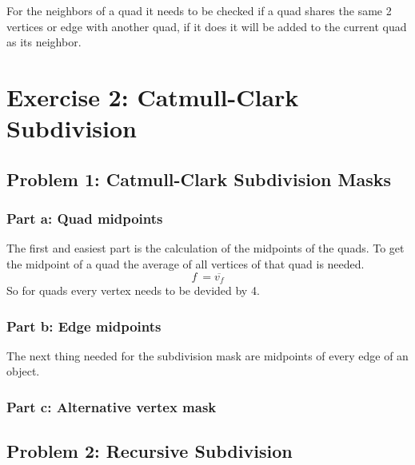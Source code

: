 \documentclass[11.5pt,oneside,a4paper]{scrartcl}
\newcounter{ct}
\begin{document}
\newpage
For the neighbors of a quad it needs to be checked if a quad shares the same 2 vertices or edge with another quad, if it does it will be added to the current quad as its neighbor.

\section{Exercise 2: Catmull-Clark Subdivision}

\subsection{Problem 1: Catmull-Clark Subdivision Masks}

\subsubsection{Part a: Quad midpoints}
The first and easiest part is the calculation of the midpoints of the quads. To get the midpoint of a quad the average of all vertices of that quad is needed.
\begin{equation} \label{quadratic}
        f \ = \overline{v_{f}}
\end{equation} 
So for quads every vertex needs to be devided by 4.

\subsubsection{Part b: Edge midpoints}
The next thing needed for the subdivision mask are midpoints of every edge of an object.

\subsubsection{Part c: Alternative vertex mask}

\subsection{Problem 2: Recursive Subdivision}
\end{document}

